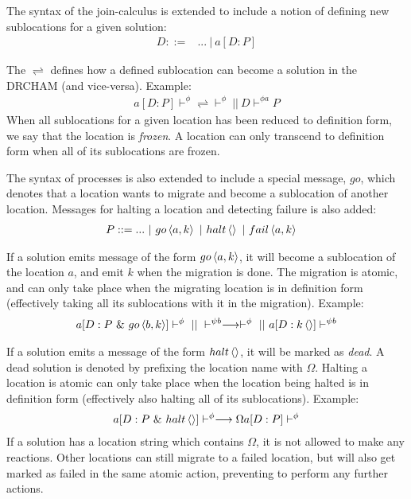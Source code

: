 The syntax of the join-calculus is extended to include a notion of defining new
sublocations for a given solution:
\begin{align*}
 D ::={}& ... ~|~ a[D : P]
\end{align*}

The $\rightleftharpoons$ defines how a defined sublocation can become a solution
in the DRCHAM (and vice-versa). Example:
\begin{align*}
 a[D : P] \vdash^\phi \rightleftharpoons \vdash^\phi ~||~ D \vdash^{\phi a} P
\end{align*}
When all sublocations for a given location has been reduced to definition form,
we say that the location is \emph{frozen}. A location can only transcend to
definition form when all of its sublocations are frozen.

The syntax of processes is also extended to include a special message, $go$,
which denotes that a location wants to migrate and become a sublocation of
another location. Messages for halting a location and detecting failure is also
added:
\begin{align*}
 P ::={}& ... ~|~ \atm go<a,k> ~|~ \atm halt<> ~|~ \atm fail<a,k>
\end{align*}

If a solution emits message of the form $\atm go<a,k>$, it will become a
sublocation of the location $a$, and emit $k$ when the migration is done. The
migration is atomic, and can only take place when the migrating location is in
definition form (effectively taking all its sublocations with it in the
migration). Example:
\begin{align*}
 a[D : P ~\&~ \atm go<b,k>] \vdash^\phi ~||~ \vdash^{\psi b}
\longrightarrow \vdash^\phi ~||~ a[D : \atm k<>] \vdash^{\psi b}
\end{align*}

If a solution emits a message of the form $\atm halt<>$, it will be marked as
\emph{dead}. A dead solution is denoted by prefixing the location name with
$\Omega$. Halting a location is atomic can only take place when the location
being halted is in definition form (effectively also halting all of its
sublocations). Example:
\begin{align*}
  a[D : P ~\&~ \atm halt<>] \vdash^\phi \longrightarrow \Omega a[D : P] \vdash^\phi
\end{align*}
If a solution has a location string which contains $\Omega$, it is not allowed
to make any reactions. Other locations can still migrate to a failed location,
but will also get marked as failed in the same atomic action, preventing to
perform any further actions.

